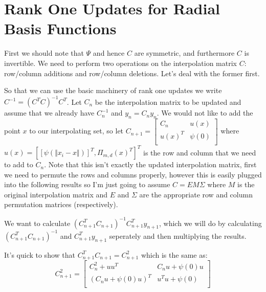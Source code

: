 \documentclass[12pt,a4paper]{article}
\begin{document}
\section{Rank One Updates for Radial Basis Functions}
First we should note that $\Psi$ and hence $C$ are symmetric, and furthermore $C$ is invertible.  We need to perform two operations on the interpolation matrix $C$: row/column additions and row/column deletions.  Let's deal with the former first.

So that we can use the basic machinery of rank one updates we write $C^{-1} = (C^TC)^{-1}C^T$.  Let $C_n$ be the interpolation matrix to be updated and assume that we already have $C^{-1}_n$ and $\hat{y_n} = C_n y_n$.  We would not like to add the point $x$ to our interpolating set, so let $C_{n+1} = \left[ \begin{array}{cc} C_n & u(x)\\ u(x)^T & \psi(0)\\ \end{array} \right]$ where $u(x) = [ [\psi( \Vert x_i - x \Vert )]^T, \Pi_{m,d}(x)^T ]^T$ is the row and column that we need to add to $C_n$.  Note that this isn't exactly the updated interpolation matrix, first we need to permute the rows and columns properly, however this is easily plugged into the following results so I'm just going to assume $C = E M \Sigma$ where $M$ is the original interpolation matrix and $E$ and $\Sigma$ are the appropriate row and column permutation matrices (respectively). 

We want to calculate $(C_{n+1}^TC_{n+1})^{-1}C_{n+1}^Ty_{n+1}$, which we will do by calculating $(C_{n+1}^TC_{n+1})^{-1}$ and $C_{n+1}^Ty_{n+1}$ seperately and then multiplying the results.

It's quick to show that $C_{n+1}^T C_{n+1} = C_{n+1}^2$ which is the same as:
\begin{equation}
C_{n+1}^2 = \left[
\begin{array}{cc}
C_n^2 + uu^T & C_n u + \psi(0) u\\
(C_n u + \psi(0) u)^T & u^Tu + \psi(0)\\
\end{array}
\right]
\end{equation}
\end{document}
